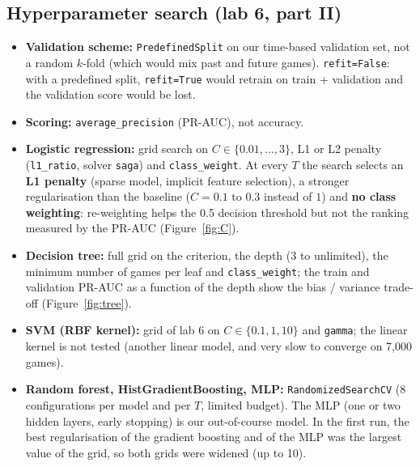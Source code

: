 \documentclass[11pt,a4paper]{article}
\newcommand{\code}[1]{\texttt{#1}}
\begin{document}
\subsection{Hyperparameter search (lab 6, part II)}
\begin{itemize}
  \item \textbf{Validation scheme:} \code{PredefinedSplit} on our time-based validation set, not a random
        $k$-fold (which would mix past and future games). \code{refit=False}: with a predefined split,
        \code{refit=True} would retrain on train + validation and the validation score would be lost.
  \item \textbf{Scoring:} \code{average\_precision} (PR-AUC), not accuracy.
  \item \textbf{Logistic regression:} grid search on $C \in \{0.01, \dots, 3\}$, L1 or L2 penalty
        (\code{l1\_ratio}, solver \code{saga}) and \code{class\_weight}.
        At every $T$ the search selects an \textbf{L1 penalty} (sparse model, implicit feature selection),
        a stronger regularisation than the baseline ($C = 0.1$ to $0.3$ instead of $1$) and
        \textbf{no class weighting}: re-weighting helps the 0.5 decision threshold but not the ranking
        measured by the PR-AUC (Figure~\ref{fig:C}).
  \item \textbf{Decision tree:} full grid on the criterion, the depth ($3$ to unlimited), the minimum
        number of games per leaf and \code{class\_weight}; the train and validation PR-AUC as a function of
        the depth show the bias / variance trade-off (Figure~\ref{fig:tree}).
  \item \textbf{SVM (RBF kernel):} grid of lab 6 on $C \in \{0.1, 1, 10\}$ and \code{gamma}; the linear
        kernel is not tested (another linear model, and very slow to converge on 7{,}000 games).
  \item \textbf{Random forest, HistGradientBoosting, MLP:} \code{RandomizedSearchCV}
        (8 configurations per model and per $T$, limited budget). The MLP (one or two hidden layers,
        early stopping) is our out-of-course model. In the first run, the best regularisation of the
        gradient boosting and of the MLP was the largest value of the grid, so both grids were widened
        (up to 10).
\end{itemize}
\end{document}
